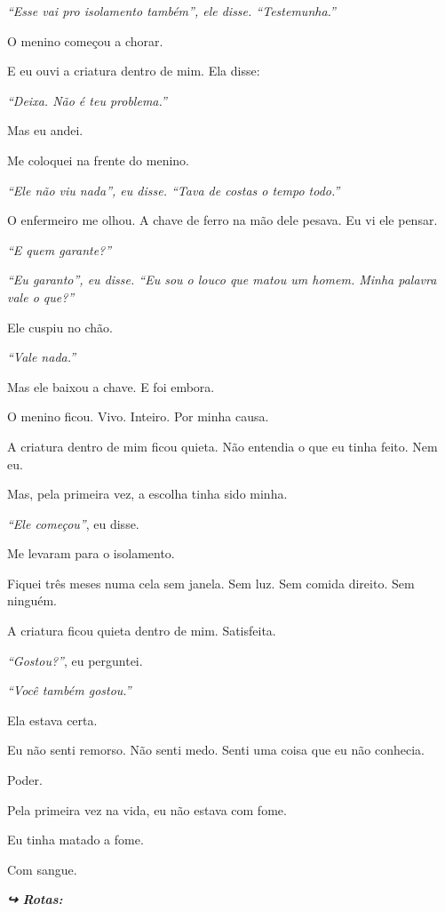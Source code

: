 \noindent \textit{\textquotedblleft{}Esse vai pro isolamento também\textquotedblright{}\textit{, ele disse. }\textquotedblleft{}Testemunha.\textquotedblright{}}

\noindent O menino começou a chorar.

\noindent E eu ouvi a criatura dentro de mim. Ela disse:

\noindent \textit{\textquotedblleft{}Deixa. Não é teu problema.\textquotedblright{}}

\noindent Mas eu andei.

\noindent Me coloquei na frente do menino.

\noindent \textit{\textquotedblleft{}Ele não viu nada\textquotedblright{}\textit{, eu disse. }\textquotedblleft{}Tava de costas o tempo todo.\textquotedblright{}}

\noindent O enfermeiro me olhou. A chave de ferro na mão dele pesava. Eu vi ele pensar.

\noindent \textit{\textquotedblleft{}E quem garante?\textquotedblright{}}

\noindent \textit{\textquotedblleft{}Eu garanto\textquotedblright{}\textit{, eu disse. }\textquotedblleft{}Eu sou o louco que matou um homem. Minha palavra vale o que?\textquotedblright{}}

\noindent Ele cuspiu no chão.

\noindent \textit{\textquotedblleft{}Vale nada.\textquotedblright{}}

\noindent Mas ele baixou a chave. E foi embora.

\noindent O menino ficou. Vivo. Inteiro. Por minha causa.

\noindent A criatura dentro de mim ficou quieta. Não entendia o que eu tinha feito. Nem eu.

\noindent Mas, pela primeira vez, a escolha tinha sido minha.

\noindent \textit{\textquotedblleft{}Ele começou\textquotedblright{}}, eu disse.

\noindent Me levaram para o isolamento.

\noindent Fiquei três meses numa cela sem janela. Sem luz. Sem comida direito. Sem ninguém.

\noindent A criatura ficou quieta dentro de mim. Satisfeita.

\noindent \textit{\textquotedblleft{}Gostou?\textquotedblright{}}, eu perguntei.

\noindent \textit{\textquotedblleft{}Você também gostou.\textquotedblright{}}

\noindent Ela estava certa.

\noindent Eu não senti remorso. Não senti medo. Senti uma coisa que eu não conhecia.

\noindent Poder.

\noindent Pela primeira vez na vida, eu não estava com fome.

\noindent Eu tinha matado a fome.

\noindent Com sangue.

\vspace{0.5em}
\noindent\textit{\textbf{↪ Rotas:}  \rotasep {} \rotasep {}}